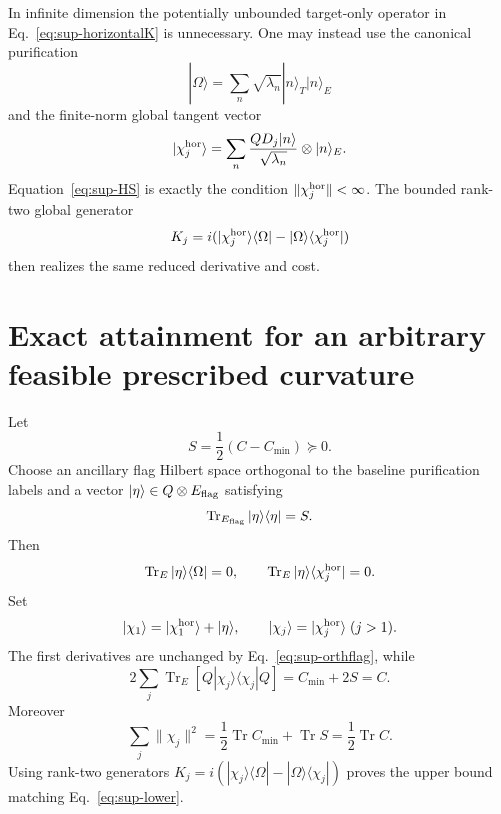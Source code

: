 \documentclass[aps,pra,preprint,nofootinbib]{revtex4-2}
\newcommand{\Tr}{\operatorname{Tr}}
\newcommand{\Cmin}{C_{\min}}
\newcommand{\Cker}{C}
\begin{document}
In infinite dimension the potentially unbounded target-only operator in Eq.~\eqref{eq:sup-horizontalK} is unnecessary. One may instead use the canonical purification
\begin{equation}
 |\Omega\rangle=\sum_n\sqrt{\lambda_n}|n\rangle_T|n\rangle_E
\end{equation}
and the finite-norm global tangent vector
\begin{equation}
 |\chi_j^{\rm hor}\rangle
 =\sum_n\frac{QD_j|n\rangle}{\sqrt{\lambda_n}}\otimes|n\rangle_E.
 \label{eq:sup-horizontalvector}
\end{equation}
Equation~\eqref{eq:sup-HS} is exactly the condition $\|\chi_j^{\rm hor}\|<\infty$. The bounded rank-two global generator
\begin{equation}
 K_j=i(|\chi_j^{\rm hor}\rangle\langle\Omega|-|\Omega\rangle\langle\chi_j^{\rm hor}|)
\end{equation}
then realizes the same reduced derivative and cost.

\section{Exact attainment for an arbitrary feasible prescribed curvature}

Let
\begin{equation}
 S=\frac12(\Cker-\Cmin)\succeq0.
\end{equation}
Choose an ancillary flag Hilbert space orthogonal to the baseline purification labels and a vector $|\eta\rangle\in Q\otimes E_{\rm flag}$ satisfying
\begin{equation}
 \Tr_{E_{\rm flag}}|\eta\rangle\langle\eta|=S.
\end{equation}
Then
\begin{equation}
 \Tr_E|\eta\rangle\langle\Omega|=0,
 \qquad
 \Tr_E|\eta\rangle\langle\chi_j^{\rm hor}|=0.
 \label{eq:sup-orthflag}
\end{equation}
Set
\begin{equation}
 |\chi_1\rangle=|\chi_1^{\rm hor}\rangle+|\eta\rangle,
 \qquad
 |\chi_j\rangle=|\chi_j^{\rm hor}\rangle\;(j>1).
\end{equation}
The first derivatives are unchanged by Eq.~\eqref{eq:sup-orthflag}, while
\begin{equation}
 2\sum_j\Tr_E[Q|\chi_j\rangle\langle\chi_j|Q]
 =\Cmin+2S=\Cker.
\end{equation}
Moreover
\begin{equation}
 \sum_j\|\chi_j\|^2
 =\frac12\Tr\Cmin+\Tr S
 =\frac12\Tr\Cker.
\end{equation}
Using rank-two generators $K_j=i(|\chi_j\rangle\langle\Omega|-|\Omega\rangle\langle\chi_j|)$ proves the upper bound matching Eq.~\eqref{eq:sup-lower}.
\end{document}
